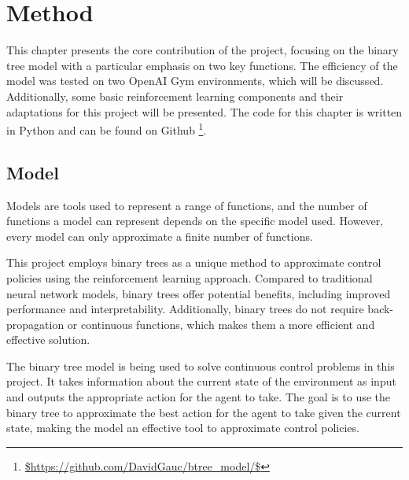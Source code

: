 
\chapter{Method}
\label{ch:method}

This chapter presents the core contribution of the project, focusing on the binary tree model with a particular emphasis on two key functions. The efficiency of the model was tested on two OpenAI Gym environments, which will be discussed. Additionally, some basic reinforcement learning components and their adaptations for this project will be presented. The code for this chapter is written in Python and can be found on Github \footnote{\url{$https://github.com/DavidGauc/btree\_model/$}}.

\section{Model}
Models are tools used to represent a range of functions, and the number of functions a model can represent depends on the specific model used. However, every model can only approximate a finite number of functions.

This project employs binary trees as a unique method to approximate control policies using the reinforcement learning approach. Compared to traditional neural network models, binary trees offer potential benefits, including improved performance and interpretability. Additionally, binary trees do not require back-propagation or continuous functions, which makes them a more efficient and effective solution.

The binary tree model is being used to solve continuous control problems in this project. It takes information about the current state of the environment as input and outputs the appropriate action for the agent to take. The goal is to use the binary tree to approximate the best action for the agent to take given the current state, making the model an effective tool to approximate control policies.

